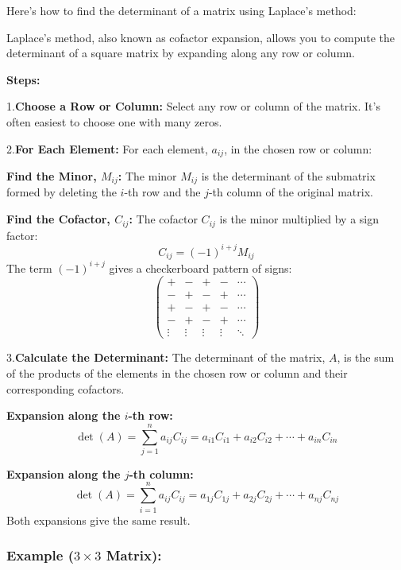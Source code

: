 Here's how to find the determinant of a matrix using Laplace's method:

Laplace's method, also known as cofactor expansion, allows you to compute the determinant of a square matrix by expanding along any row or column.

\textbf{Steps:}

1.\textbf{Choose a Row or Column:} Select any row or column of the matrix.  It's often easiest to choose one with many zeros.

 2.\textbf{For Each Element:} For each element, \(a_{ij}\), in the chosen row or column:

    \textbf{Find the Minor, \(M_{ij}\):} The minor \(M_{ij}\) is the determinant of the submatrix formed by deleting the 
    \indent \(i\)-th row and the \(j\)-th column of the original matrix.

    \textbf{Find the Cofactor, \(C_{ij}\):} The cofactor \(C_{ij}\) is the minor multiplied by a sign factor:
        \[
        C_{ij} = (-1)^{i+j} M_{ij}
        \]
        The term  \((-1)^{i+j}\)  gives a checkerboard pattern of signs:
        \[
        \begin{pmatrix}
        + & - & + & - & \cdots \\
        - & + & - & + & \cdots \\
        + & - & + & - & \cdots \\
        - & + & - & + & \cdots \\
        \vdots & \vdots & \vdots & \vdots & \ddots
        \end{pmatrix}
        \]

 3.\textbf{Calculate the Determinant:} The determinant of the matrix, \(A\), is the sum of the products of the elements in the chosen row or column and their corresponding cofactors.

    \textbf{Expansion along the \(i\)-th row:}
        \[
        \det(A) = \sum_{j=1}^{n} a_{ij} C_{ij} = a_{i1}C_{i1} + a_{i2}C_{i2} + \cdots + a_{in}C_{in}
        \]

    \textbf{Expansion along the \(j\)-th column:}
        \[
        \det(A) = \sum_{i=1}^{n} a_{ij} C_{ij} = a_{1j}C_{1j} + a_{2j}C_{2j} + \cdots + a_{nj}C_{nj}
        \]
        Both expansions give the same result.

\subsubsection*{Example (\(3\times3\) Matrix):}

